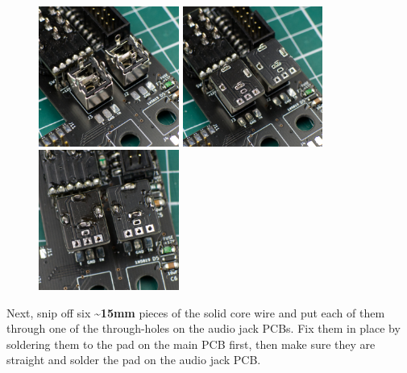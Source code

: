 \documentclass[12pt, a4paper]{article}
\begin{document}
\begin{figure}[H]
    \centering
    \includegraphics[width=46mm]{images/section_3-3_screwed.jpg}
    \hspace{2mm}
    \includegraphics[width=46mm]{images/section_3-3_pcb.jpg}
    \hspace{2mm}
    \includegraphics[width=46mm]{images/section_3-3_pcb_soldered.jpg}
\end{figure}

Next, snip off six \textbf{\textasciitilde15mm} pieces of the solid core wire and put each of them
through one of the through-holes on the audio jack PCBs. Fix them in place by soldering them to
the pad on the main PCB first, then make sure they are straight and solder the pad on the audio
jack PCB.
\end{document}
